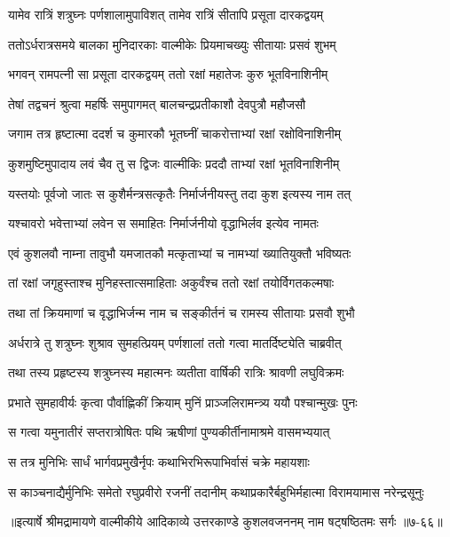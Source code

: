
\twolineshloka
{यामेव रात्रिं शत्रुघ्नः पर्णशालामुपाविशत्}
{तामेव रात्रिं सीतापि प्रसूता दारकद्वयम्} %

\twolineshloka
{ततोऽर्धरात्रसमये बालका मुनिदारकाः}
{वाल्मीकेः प्रियमाचख्युः सीतायाः प्रसवं शुभम्} %

\twolineshloka
{भगवन् रामपत्नी सा प्रसूता दारकद्वयम्}
{ततो रक्षां महातेजः कुरु भूतविनाशिनीम्} %

\twolineshloka
{तेषां तद्वचनं श्रुत्वा महर्षिः समुपागमत्}
{बालचन्द्रप्रतीकाशौ देवपुत्रौ महौजसौ} %

\twolineshloka
{जगाम तत्र हृष्टात्मा ददर्श च कुमारकौ}
{भूतघ्नीं चाकरोत्ताभ्यां रक्षां रक्षोविनाशिनीम्} %

\twolineshloka
{कुशमुष्टिमुपादाय लवं चैव तु स द्विजः}
{वाल्मीकिः प्रददौ ताभ्यां रक्षां भूतविनाशिनीम्} %

\twolineshloka
{यस्तयोः पूर्वजो जातः स कुशैर्मन्त्रसत्कृतैः}
{निर्मार्जनीयस्तु तदा कुश इत्यस्य नाम तत्} %

\twolineshloka
{यश्चावरो भवेत्ताभ्यां लवेन स समाहितः}
{निर्मार्जनीयो वृद्धाभिर्लव इत्येव नामतः} %

\twolineshloka
{एवं कुशलवौ नाम्ना तावुभौ यमजातकौ}
{मत्कृताभ्यां च नामभ्यां ख्यातियुक्तौ भविष्यतः} %

\twolineshloka
{तां रक्षां जगृहुस्ताश्च मुनिहस्तात्समाहिताः}
{अकुर्वंश्च ततो रक्षां तयोर्विगतकल्मषाः} %

\twolineshloka
{तथा तां क्रियमाणां च वृद्धाभिर्जन्म नाम च}
{सङ्कीर्तनं च रामस्य सीतायाः प्रसवौ शुभौ} %

\twolineshloka
{अर्धरात्रे तु शत्रुघ्नः शुश्राव सुमहत्प्रियम्}
{पर्णशालां ततो गत्वा मातर्दिष्ट्येति चाब्रवीत्} %

\twolineshloka
{तथा तस्य प्रहृष्टस्य शत्रुघ्नस्य महात्मनः}
{व्यतीता वार्षिकी रात्रिः श्रावणी लघुविक्रमः} %

\twolineshloka
{प्रभाते सुमहावीर्यः कृत्वा पौर्वाह्णिकीं क्रियाम्}
{मुनिं प्राञ्जलिरामन्त्र्य ययौ पश्चान्मुखः पुनः} %

\twolineshloka
{स गत्वा यमुनातीरं सप्तरात्रोषितः पथि}
{ऋषीणां पुण्यकीर्तीनामाश्रमे वासमभ्ययात्} %

\twolineshloka
{स तत्र मुनिभिः सार्धं भार्गवप्रमुखैर्नृपः}
{कथाभिरभिरूपाभिर्वासं चक्रे महायशाः} %

\twolineshloka
{स काञ्चनाद्यैर्मुनिभिः समेतो रघुप्रवीरो रजनीं तदानीम्}
{कथाप्रकारैर्बहुभिर्महात्मा विरामयामास नरेन्द्रसूनुः} %


॥इत्यार्षे श्रीमद्रामायणे वाल्मीकीये आदिकाव्ये उत्तरकाण्डे कुशलवजननम् नाम षट्षष्ठितमः सर्गः ॥७-६६॥
